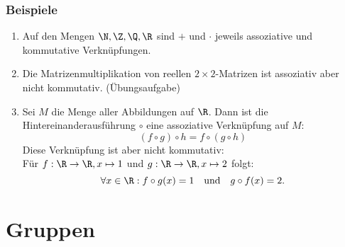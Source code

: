 %
%
\begin{frame}\frametitle{Beispiele}
	
	\begin{enumerate}
		\item Auf den Mengen $\N, \Z, \Q, \R$ sind $+$ und $\cdot$ jeweils assoziative und kommutative Verknüpfungen.
		\pause
		\item Die Matrizenmultiplikation von reellen $2\times 2$-Matrizen ist assoziativ aber nicht kommutativ. (\"Ubungsaufgabe)
		\pause
		\item Sei $M$ die Menge aller Abbildungen auf $\R$. 
		Dann ist die Hintereinanderausführung $\circ$ eine assoziative Verknüpfung auf $M$:
		$$
			(f\circ g) \circ h = f\circ (g\circ h)
		$$
		Diese Verknüpfung ist aber nicht kommutativ:\\
		Für $f: \R\to \R, x\mapsto 1$ und $g: \R\to \R, x\mapsto 2$ folgt:
		$$
			\forall x\in\R: f\circ g(x) = 1 \quad\text{und}\quad g\circ f(x) = 2.
		$$
		
	\end{enumerate}
	
\end{frame}
%
\section{Gruppen}
%
